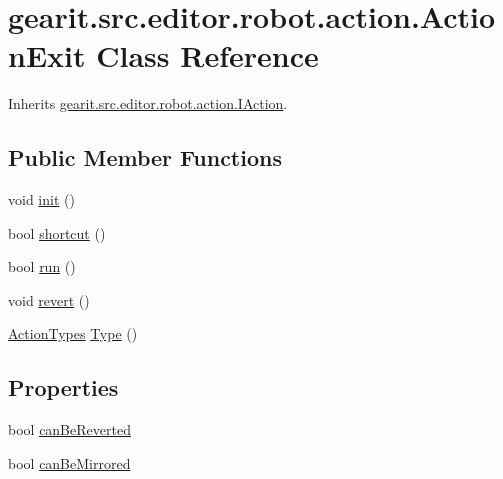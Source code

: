 \hypertarget{classgearit_1_1src_1_1editor_1_1robot_1_1action_1_1_action_exit}{\section{gearit.\+src.\+editor.\+robot.\+action.\+Action\+Exit Class Reference}
\label{classgearit_1_1src_1_1editor_1_1robot_1_1action_1_1_action_exit}
}


Inherits \hyperlink{interfacegearit_1_1src_1_1editor_1_1robot_1_1action_1_1_i_action}{gearit.\+src.\+editor.\+robot.\+action.\+I\+Action}.

\subsection*{Public Member Functions}
\begin{DoxyCompactItemize}
\item 
void \hyperlink{classgearit_1_1src_1_1editor_1_1robot_1_1action_1_1_action_exit_abc514e1b63dec4d561c66e2b35ff43a8}{init} ()
\item 
bool \hyperlink{classgearit_1_1src_1_1editor_1_1robot_1_1action_1_1_action_exit_a2cf5998595f7cc27dd95f2cc33025384}{shortcut} ()
\item 
bool \hyperlink{classgearit_1_1src_1_1editor_1_1robot_1_1action_1_1_action_exit_a6a4dc7c7e8d8e3cded6559022ca6e0d8}{run} ()
\item 
void \hyperlink{classgearit_1_1src_1_1editor_1_1robot_1_1action_1_1_action_exit_acccbc7c7304780b60505c5a7347ea738}{revert} ()
\item 
\hyperlink{namespacegearit_1_1src_1_1editor_1_1robot_1_1action_a4be0fd46e3952d6135136b20e7b3fc5e}{Action\+Types} \hyperlink{classgearit_1_1src_1_1editor_1_1robot_1_1action_1_1_action_exit_a0429619b9154fea4e8ddaa0c71d28b95}{Type} ()
\end{DoxyCompactItemize}
\subsection*{Properties}
\begin{DoxyCompactItemize}
\item 
bool \hyperlink{classgearit_1_1src_1_1editor_1_1robot_1_1action_1_1_action_exit_a8bec059fc8022d560c21213dfda039ba}{can\+Be\+Reverted}
\item 
bool \hyperlink{classgearit_1_1src_1_1editor_1_1robot_1_1action_1_1_action_exit_a38f5eb534d5eaddc25e6e17a90921ee6}{can\+Be\+Mirrored}
\end{DoxyCompactItemize}


